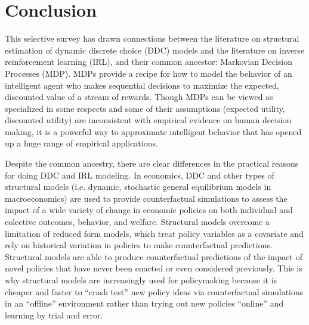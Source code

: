 \section{Conclusion\label{sec:conclusion}}
This selective survey has drawn connections between
the literature on structural estimation of dynamic discrete choice (DDC) models and the literature on inverse reinforcement learning (IRL), 
and their common ancestor:  Markovian Decision Processes (MDP).
MDPs provide a recipe for how to model the behavior of an intelligent agent who makes sequential
decisions to maximize the expected, discounted value of a stream
of rewards.  Though MDPs can be viewed as specialized in some respects and some of their
assumptions (expected utility, discounted utility) are inconsistent with empirical 
evidence on human decision making, it is a powerful way to approximate 
intelligent behavior that has opened up a huge range of empirical applications.

Despite the common ancestry, there are clear differences in the practical reasons for doing DDC and IRL modeling.
In economics, DDC and other types of structural models (i.e. dynamic, stochastic
general equilibrium models in macroeconomics)  are used to provide counterfactual
simulations to assess the impact of a wide variety of change in economic
policies on both individual and colective outcomes, behavior, and welfare. 
Structural models overcome a limitation 
of reduced form models, which treat policy variables as a covariate and rely on historical variation in policies to make
counterfactual predictions. Structural models are able to produce counterfactual predictions
of the impact of novel policies that have never been enacted or even considered previously.
This is why structural models are increasingly used for policymaking because it is cheaper and faster to ``crash test'' new policy ideas
via counterfactual simulations in an ``offline'' environment rather
than trying out new policies ``online'' and learning by trial and error.

